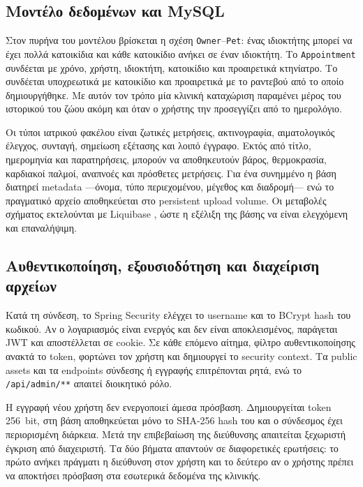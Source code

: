 \subsection{Μοντέλο δεδομένων και MySQL}

Στον πυρήνα του μοντέλου βρίσκεται η σχέση \texttt{Owner}--\texttt{Pet}:
ένας ιδιοκτήτης μπορεί να έχει πολλά κατοικίδια και κάθε κατοικίδιο ανήκει σε
έναν ιδιοκτήτη. Το \texttt{Appointment} συνδέεται με χρόνο, χρήστη,
ιδιοκτήτη, κατοικίδιο και προαιρετικά κτηνίατρο. Το
 συνδέεται υποχρεωτικά με κατοικίδιο και προαιρετικά
με το ραντεβού από το οποίο δημιουργήθηκε. Με αυτόν τον τρόπο μία κλινική
καταχώριση παραμένει μέρος του ιστορικού του ζώου ακόμη και όταν ο χρήστης
την προσεγγίζει από το ημερολόγιο.

Οι τύποι ιατρικού φακέλου είναι ζωτικές μετρήσεις, ακτινογραφία,
αιματολογικός έλεγχος, συνταγή, σημείωση εξέτασης και λοιπό έγγραφο. Εκτός από
τίτλο, ημερομηνία και παρατηρήσεις, μπορούν να αποθηκευτούν βάρος,
θερμοκρασία, καρδιακοί παλμοί, αναπνοές και πρόσθετες μετρήσεις. Για ένα
συνημμένο η βάση διατηρεί metadata ---όνομα, τύπο περιεχομένου, μέγεθος και
διαδρομή--- ενώ το πραγματικό αρχείο αποθηκεύεται στο persistent upload
volume. Οι μεταβολές σχήματος εκτελούνται με Liquibase
\cite{liquibase2026changelog}, ώστε η εξέλιξη της
βάσης να είναι ελεγχόμενη και επαναλήψιμη.

\subsection{Αυθεντικοποίηση, εξουσιοδότηση και διαχείριση αρχείων}

Κατά τη σύνδεση, το Spring Security ελέγχει το username και το BCrypt hash
του κωδικού. Αν ο λογαριασμός είναι ενεργός και δεν είναι αποκλεισμένος,
παράγεται JWT και αποστέλλεται σε cookie. Σε κάθε επόμενο αίτημα, φίλτρο
αυθεντικοποίησης ανακτά το token, φορτώνει τον χρήστη και δημιουργεί το
security context. Τα public assets και τα endpoints σύνδεσης ή εγγραφής
επιτρέπονται ρητά, ενώ το \texttt{/api/admin/**} απαιτεί διοικητικό ρόλο.

Η εγγραφή νέου χρήστη δεν ενεργοποιεί άμεσα πρόσβαση. Δημιουργείται token
256~bit, στη βάση αποθηκεύεται μόνο το SHA-256 hash του και ο σύνδεσμος έχει
περιορισμένη διάρκεια. Μετά την επιβεβαίωση της διεύθυνσης απαιτείται
ξεχωριστή έγκριση από διαχειριστή. Τα δύο βήματα απαντούν σε διαφορετικές
ερωτήσεις: το πρώτο ανήκει πράγματι η διεύθυνση στον χρήστη και το δεύτερο αν
ο χρήστης πρέπει να αποκτήσει πρόσβαση στα εσωτερικά δεδομένα της κλινικής.

